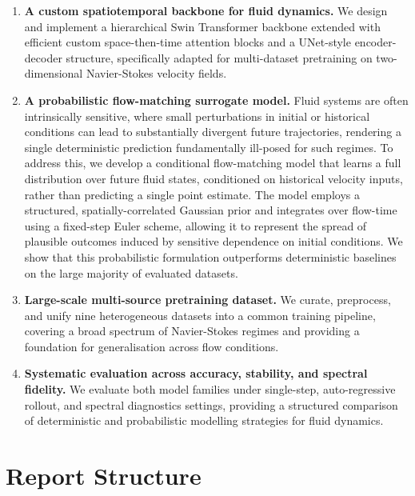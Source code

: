 \begin{enumerate}
    \item \textbf{A custom spatiotemporal backbone for fluid dynamics.} We design and implement a hierarchical Swin Transformer backbone extended with efficient custom space-then-time attention blocks and a UNet-style encoder-decoder structure, specifically adapted for multi-dataset pretraining on two-dimensional Navier-Stokes velocity fields.

    \item \textbf{A probabilistic flow-matching surrogate model.} Fluid systems are often intrinsically sensitive, where small perturbations in initial or historical conditions can lead to substantially divergent future trajectories, rendering a single deterministic prediction fundamentally ill-posed for such regimes. To address this, we develop a conditional flow-matching model that learns a full distribution over future fluid states, conditioned on historical velocity inputs, rather than predicting a single point estimate. The model employs a structured, spatially-correlated Gaussian prior and integrates over flow-time using a fixed-step Euler scheme, allowing it to represent the spread of plausible outcomes induced by sensitive dependence on initial conditions. We show that this probabilistic formulation outperforms deterministic baselines on the large majority of evaluated datasets.

    \item \textbf{Large-scale multi-source pretraining dataset.} We curate, preprocess, and unify nine heterogeneous datasets into a common training pipeline, covering a broad spectrum of Navier-Stokes regimes and providing a foundation for generalisation across flow conditions.

    \item \textbf{Systematic evaluation across accuracy, stability, and spectral fidelity.} We evaluate both model families under single-step, auto-regressive rollout, and spectral diagnostics settings, providing a structured comparison of deterministic and probabilistic modelling strategies for fluid dynamics.
\end{enumerate}

\section{Report Structure}

